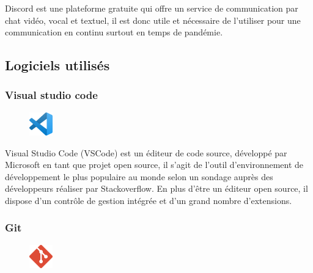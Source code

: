 Discord est une plateforme gratuite qui offre un service de communication par 
chat vidéo, vocal et textuel, il est donc utile et nécessaire de l’utiliser pour 
une communication en continu surtout en temps de pandémie\cite{40}.
        
    
\subsection{Logiciels utilisés}
\subsubsection*{Visual studio code}
    \begin{figure}
        \vspace{-20pt}
        \begin{center}
            \includegraphics[width=0.09\textwidth]{images/VSCode logo.png}
            \label{fig66}
        \end{center}
        \vspace{-20pt}
        \vspace{-10pt}
    \end{figure}

Visual Studio Code (VSCode) est un éditeur de code source, développé par 
Microsoft en tant que projet open source, il s’agit de l’outil d’environnement 
de développement le plus populaire au monde selon un sondage auprès des 
développeurs réaliser par Stackoverflow\cite{13}. En plus d’être un éditeur open 
source, il dispose d’un contrôle de gestion intégrée et d’un grand nombre 
d’extensions\cite{41}.
            
            
\subsubsection*{Git}
    \begin{figure}
        \vspace{-28pt}
        \begin{center}
            \includegraphics[width=0.09\textwidth]{images/git logo.png}
            \label{fig67}
        \end{center}
        \vspace{-20pt}
        \vspace{-10pt}
    \end{figure}   

